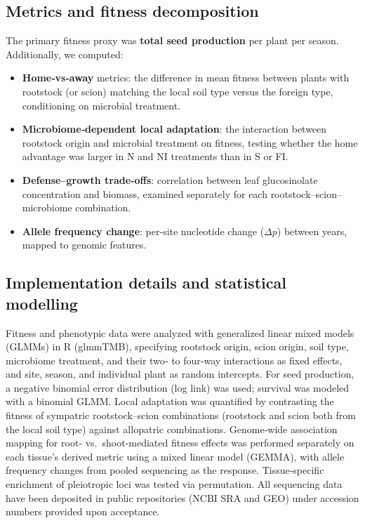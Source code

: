 \documentclass{article}
\begin{document}
\begin{itemize}
\subsection{Metrics and fitness decomposition}
The primary fitness proxy was \textbf{total seed production} per plant per season. Additionally, we computed:
\begin{itemize}
    \item \textbf{Home‑vs‑away} metrics: the difference in mean fitness between plants with rootstock (or scion) matching the local soil type versus the foreign type, conditioning on microbial treatment.
    \item \textbf{Microbiome‑dependent local adaptation}: the interaction between rootstock origin and microbial treatment on fitness, testing whether the home advantage was larger in N and NI treatments than in S or FI.
    \item \textbf{Defense–growth trade‑offs}: correlation between leaf glucosinolate concentration and biomass, examined separately for each rootstock–scion–microbiome combination.
    \item \textbf{Allele frequency change}: per‑site nucleotide change (\(\Delta p\)) between years, mapped to genomic features.
\end{itemize}

\subsection{Implementation details and statistical modelling}
Fitness and phenotypic data were analyzed with generalized linear mixed models (GLMMs) in R (glmmTMB), specifying rootstock origin, scion origin, soil type, microbiome treatment, and their two‑ to four‑way interactions as fixed effects, and site, season, and individual plant as random intercepts. For seed production, a negative binomial error distribution (log link) was used; survival was modeled with a binomial GLMM. Local adaptation was quantified by contrasting the fitness of sympatric rootstock–scion combinations (rootstock and scion both from the local soil type) against allopatric combinations. Genome‑wide association mapping for root‑ vs.\ shoot‑mediated fitness effects was performed separately on each tissue’s derived metric using a mixed linear model (GEMMA), with allele frequency changes from pooled sequencing as the response. Tissue‑specific enrichment of pleiotropic loci was tested via permutation. All sequencing data have been deposited in public repositories (NCBI SRA and GEO) under accession numbers provided upon acceptance.


\end{itemize}
\end{document}
